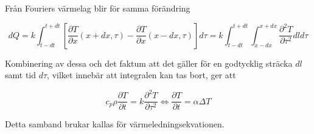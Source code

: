Från Fouriers värmelag blir för samma förändring

\begin{equation}
dQ = k\int_{t-dt}^{t+dt} \left[ \frac{\partial T}{\partial x}\left( x + dx, \tau \right) - \frac{\partial T}{\partial x}\left( x-dx, \tau \right)\right]d\tau = k\int_{t-dt}^{t+dt} \int_{x-dx}^{x+dx} \frac{\partial^2 T}{\partial \tau^2} dld\tau
\end{equation}

Kombinering av dessa och det faktum att det gäller för en godtycklig sträcka $dl$ samt tid $d\tau$, vilket innebär att integralen kan tas bort, ger att

\begin{equation}\boxed{ \; \; \;
c_p \rho \frac{\partial T}{\partial t} = k \frac{\partial^2 T}{\partial \tau^2} \Leftrightarrow \frac{\partial T}{\partial t} = \alpha \Delta T
\; \; \; }
\end{equation}

Detta samband brukar kallas för värmeledningsekvationen.
